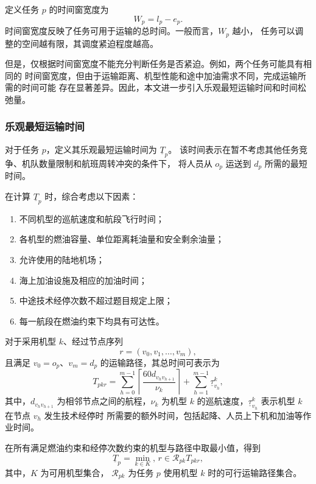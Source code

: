 \documentclass[UTF8,a4paper,zihao=5]{ctexart}
\begin{document}
定义任务 $p$ 的时间窗宽度为
\begin{equation}
    W_p=l_p-e_p.
    \label{eq:window_width}
\end{equation}
时间窗宽度反映了任务可用于运输的总时间。一般而言，$W_p$ 越小，
任务可以调整的空间越有限，其调度紧迫程度越高。

但是，仅根据时间窗宽度不能充分判断任务是否紧迫。例如，两个任务可能具有相同的
时间窗宽度，但由于运输距离、机型性能和途中加油需求不同，完成运输所需的时间可能
存在显著差异。因此，本文进一步引入乐观最短运输时间和时间松弛量。

\subsubsection{乐观最短运输时间}

对于任务 $p$，定义其乐观最短运输时间为 $\underline{T}_p$。
该时间表示在暂不考虑其他任务竞争、机队数量限制和航班周转冲突的条件下，
将人员从 $o_p$ 运送到 $d_p$ 所需的最短时间。

在计算 $\underline{T}_p$ 时，综合考虑以下因素：

\begin{enumerate}
    \item 不同机型的巡航速度和航段飞行时间；
    \item 各机型的燃油容量、单位距离耗油量和安全剩余油量；
    \item 允许使用的陆地机场；
    \item 海上加油设施及相应的加油时间；
    \item 中途技术经停次数不超过题目规定上限；
    \item 每一航段在燃油约束下均具有可达性。
\end{enumerate}

对于采用机型 $k$、经过节点序列
\[
    r=(v_0,v_1,\ldots,v_m),
\]
且满足 $v_0=o_p$、$v_m=d_p$ 的运输路径，其总时间可表示为
\begin{equation}
    T_{pkr}
    =
    \sum_{h=0}^{m-1}
    \left\lceil
    \frac{60d_{v_hv_{h+1}}}{\nu_k}
    \right\rceil
    +
    \sum_{h=1}^{m-1}\underline{\tau}_{v_h}^{k},
    \label{eq:q3_path_time}
\end{equation}
其中，$d_{v_hv_{h+1}}$ 为相邻节点之间的航程，$\nu_k$ 为机型 $k$
的巡航速度，$\underline{\tau}_{v_h}^{k}$ 表示机型 $k$ 在节点 $v_h$ 发生技术经停时
所需要的额外时间，包括起降、人员上下机和加油等作业时间。

在所有满足燃油约束和经停次数约束的机型与路径中取最小值，得到
\begin{equation}
    \underline{T}_p
    =
    \min_{k\in K},\,r\in\mathcal{R}_{pk}
    T_{pkr},
    \label{eq:optimistic_time}
\end{equation}
其中，$ K $ 为可用机型集合，
$\mathcal{R}_{pk}$ 为任务 $p$ 使用机型 $k$ 时的可行运输路径集合。
\end{document}
